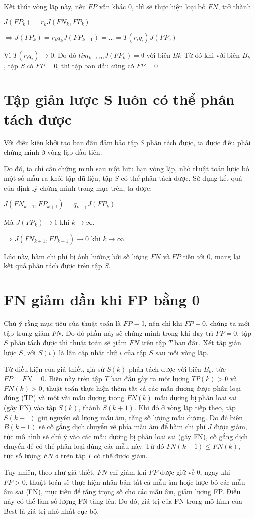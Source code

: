 \documentclass[./../main.tex]{subfiles}
\begin{document}
Kết thúc vòng lặp này, nếu $FP$ vẫn khác 0, thì sẽ thực hiện loại bỏ $FN$, trở thành


$J(FP_k) = r_k J(FN_k, FP_k)$


$\Rightarrow J(FP_k) = r_k q_k J(FP_{k-1}) = \ldots = T(r_i q_i)J(FP_0)$

Vì $T(r_i q_i) \rightarrow 0$. Do đó $lim_{k \to \infty} J(FP_k) = 0$ với biên $Bk$
Từ đó khi với biên $B_k$, tập $S$ có $FP = 0$, thì tập ban đầu cũng có $FP=0$

\section{Tập giản lược S luôn có thể phân tách được}

Với điều kiện khởi tạo ban đầu đảm bảo tập $S$ phân tách được, ta được điều phải chứng minh ở vòng lặp đầu tiên.

Do đó, ta chỉ cần chứng minh sau một hữu hạn vòng lặp, nhờ thuật toán lược bỏ một số mẫu ra khỏi tập dữ liệu, tập $S$ có thể phân tách được. Sử dụng kết quả của định lý chứng minh trong mục trên, ta được:

$J(FN_{k+1}, FP_{k+1}) = q_{k+1} J(FP_k)$


Mà $J(FP_k) \rightarrow 0$ khi $k \to \infty$.


$ \Rightarrow J(FN_{k+1}, FP_{k+1}) \rightarrow 0$ khi $k \to \infty$.

Lúc này, hàm chi phí bị ảnh hưởng bởi số lượng $FN$ và $FP$ tiến tới $0$, mang lại kết quả phân tách được trên tập $S$.


\section{FN giảm dần khi FP bằng 0}

Chú ý rằng mục tiêu của thuật toán là $FP = 0$, nên chỉ khi $FP=0$, chúng ta mới tập trung giảm $FN$. Do đó phần này sẽ chứng minh trong khi duy trì $FP=0$, tập $S$ phân tách được thì thuật toán sẽ giảm $FN$ trên tập $T$ ban đầu.
Xét tập giản lược $S$, với $S(i)$ là lần cập nhật thứ $i$ của tập $S$ sau mỗi vòng lặp.

Từ điều kiện của giả thiết, giả sử $S(k)$ phân tách được với biên $B_k$, tức $FP=FN=0$. Biên này trên tập $T$ ban đầu gây ra một lượng $TP(k)>0$ và $FN(k) >0$, thuật toán thực hiện thêm tất cả các mẫu dương được phân loại đúng (TP) và một vài mẫu dương trong $FN(k)$ mẫu dương bị phân loại sai (gây FN) vào tập $S(k)$, thành $S(k+1)$. Khi đó ở vòng lặp tiếp theo, tập $S(k+1)$ giữ nguyên số lượng mẫu âm, tăng số lượng mẫu dương. Do đó biên $B(k+1)$ sẽ cố gắng dịch chuyển về phía mẫu âm để hàm chi phí $J$ được giảm, tức mô hình sẽ chú ý vào các mẫu dương bị phân loại sai (gây FN), cố gắng dịch chuyển để có thể phân loại đúng các mẫu này. Từ đó $FN(k+1) \leq FN(k)$, tức số lượng $FN$ ở trên tập $T$ có thể được giảm.

Tuy nhiên, theo như giả thiết, $FN$ chỉ giảm khi $FP$ được giữ về 0, ngay khi $FP >0$, thuật toán sẽ thực hiện nhân bản tất cả mẫu âm hoặc lược bỏ các mẫu âm sai (FN), mục tiêu để tăng trọng số cho các mẫu âm, giảm lượng FP. Điều này có thể làm số lượng FN tăng lên. Do đó, giá trị của FN trong mô hình của Best là giá trị nhỏ nhất cục bộ.
\end{document}
